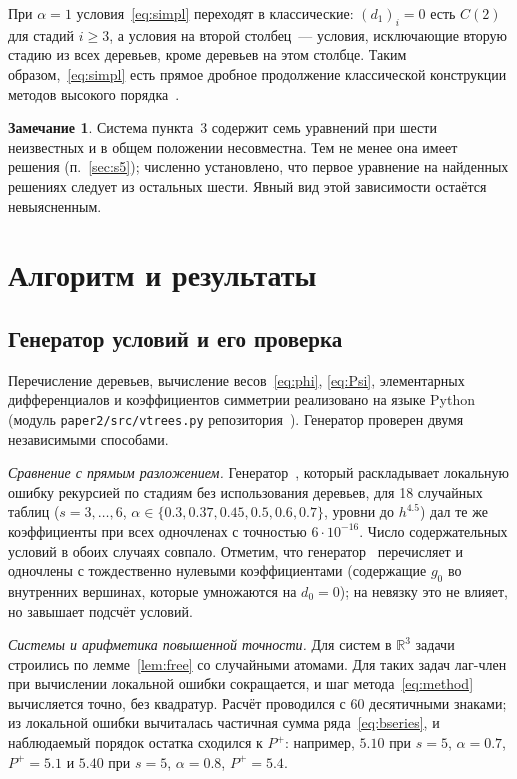\documentclass[11pt,a4paper]{article}
\theoremstyle{plain}
\theoremstyle{definition}
\newtheorem{remark}{Замечание}
\begin{document}
При $\alpha=1$ условия~\eqref{eq:simpl} переходят в классические: $(d_1)_i=0$ есть $C(2)$ для стадий $i\ge3$, а условия на второй столбец~--- условия, исключающие вторую стадию из всех деревьев, кроме деревьев на этом столбце. Таким образом,~\eqref{eq:simpl} есть прямое дробное продолжение классической конструкции методов высокого порядка~\cite{Butcher1964,Butcher2016}.

\begin{remark}
Система пункта~3 содержит семь уравнений при шести неизвестных и в общем положении несовместна. Тем не менее она имеет решения (п.~\ref{sec:s5}); численно установлено, что первое уравнение на найденных решениях следует из остальных шести. Явный вид этой зависимости остаётся невыясненным.
\end{remark}

\section{Алгоритм и результаты}

\subsection{Генератор условий и его проверка}\label{sec:generator2}

Перечисление деревьев, вычисление весов~\eqref{eq:phi}, \eqref{eq:Psi}, элементарных дифференциалов и коэффициентов симметрии реализовано на языке Python (модуль \texttt{paper2/src/vtrees.py} репозитория~\cite{repo}). Генератор проверен двумя независимыми способами.

\emph{Сравнение с прямым разложением.} Генератор~\cite{PrikBarriers}, который раскладывает локальную ошибку рекурсией по стадиям без использования деревьев, для 18 случайных таблиц ($s=3,\dots,6$, $\alpha\in\{0.3,0.37,0.45,0.5,0.6,0.7\}$, уровни до $h^{4.5}$) дал те же коэффициенты при всех одночленах с точностью $6\cdot10^{-16}$. Число содержательных условий в обоих случаях совпало. Отметим, что генератор~\cite{PrikBarriers} перечисляет и одночлены с тождественно нулевыми коэффициентами (содержащие $g_0$ во внутренних вершинах, которые умножаются на $d_0=0$); на невязку это не влияет, но завышает подсчёт условий.

\emph{Системы и арифметика повышенной точности.} Для систем в $\mathbb R^3$ задачи строились по лемме~\ref{lem:free} со случайными атомами. Для таких задач лаг-член при вычислении локальной ошибки сокращается, и шаг метода~\eqref{eq:method} вычисляется точно, без квадратур. Расчёт проводился с 60 десятичными знаками; из локальной ошибки вычиталась частичная сумма ряда~\eqref{eq:bseries}, и наблюдаемый порядок остатка сходился к $P^{+}$: например, $5.10$ при $s=5$, $\alpha=0.7$, $P^{+}=5.1$ и $5.40$ при $s=5$, $\alpha=0.8$, $P^{+}=5.4$.
\end{document}
